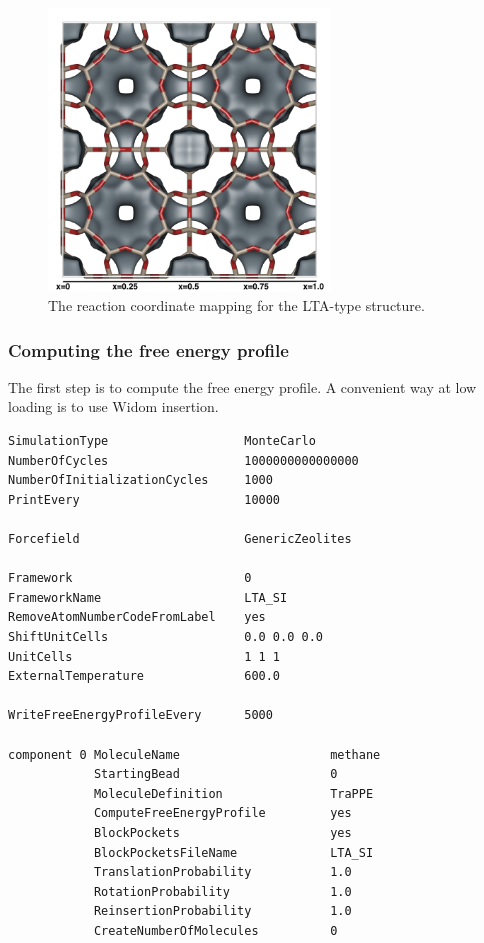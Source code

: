 \begin{figure}[t]
  \centering
  \includegraphics[width=7.5cm]{./Examples/Figures/LTA_dcTST.png}
  \caption{The reaction coordinate mapping for the LTA-type structure.}
  \label{Fig: LTA dcTST}
\end{figure}

\subsubsection{Computing the free energy profile}

The first step is to compute the free energy profile.
A convenient way at low loading is to use Widom insertion.

\begin{tiny}
\begin{verbatim}
SimulationType                   MonteCarlo
NumberOfCycles                   1000000000000000
NumberOfInitializationCycles     1000
PrintEvery                       10000

Forcefield                       GenericZeolites

Framework                        0
FrameworkName                    LTA_SI
RemoveAtomNumberCodeFromLabel    yes
ShiftUnitCells                   0.0 0.0 0.0
UnitCells                        1 1 1
ExternalTemperature              600.0

WriteFreeEnergyProfileEvery      5000

component 0 MoleculeName                     methane
            StartingBead                     0
            MoleculeDefinition               TraPPE
            ComputeFreeEnergyProfile         yes
            BlockPockets                     yes
            BlockPocketsFileName             LTA_SI
            TranslationProbability           1.0
            RotationProbability              1.0
            ReinsertionProbability           1.0
            CreateNumberOfMolecules          0
\end{verbatim}
\end{tiny}

